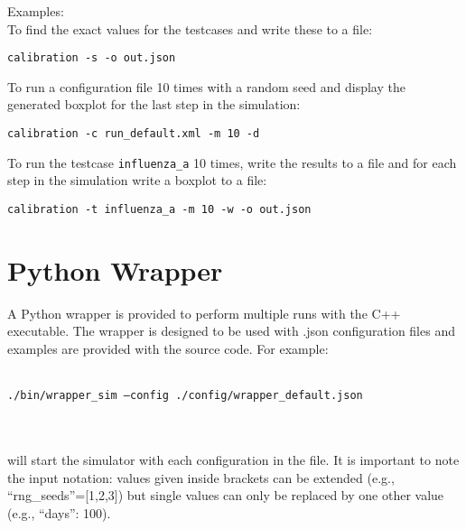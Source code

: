 Examples:\\
To find the exact values for the testcases and write these to a file:\\

\centerline{\texttt{calibration -s -o out.json}}

To run a configuration file 10 times with a random seed and display the generated boxplot for the last step in the simulation:\\

\centerline{\texttt{calibration -c run\_default.xml -m 10 -d}}

To run the testcase \texttt{influenza\_a} 10 times, write the results to a file and for each step in the simulation write a boxplot to a file:\\

\centerline{\texttt{calibration -t influenza\_a -m 10 -w -o out.json}}



\section{Python Wrapper}
A Python wrapper is provided to perform multiple runs with the C++ executable.
The wrapper is designed to be used with .json configuration files and examples are provided with the source code.
For example: \\ \\
\centerline{\texttt{./bin/wrapper\_sim --config ./config/wrapper\_default.json}} \\ \\
will start the simulator with each configuration in the file.
It is important to note the input notation: values given inside brackets can be extended (e.g., ``rng\_seeds''=[1,2,3]) but single values can only be replaced by one other value (e.g., ``days'': 100).


